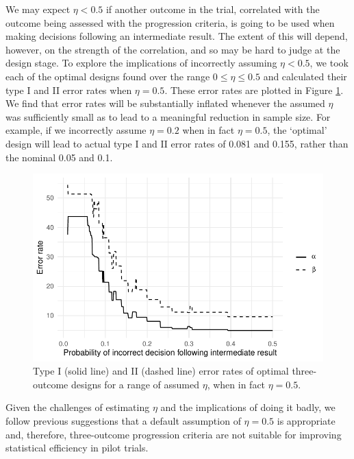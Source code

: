\documentclass[sagev]{sagej}
\begin{document}
We may expect $\eta < 0.5$ if another outcome in the trial, correlated with the outcome being assessed with the progression criteria, is going to be used when making decisions following an intermediate result. The extent of this will depend, however, on the strength of the correlation, and so may be hard to judge at the design stage. To explore the implications of incorrectly assuming $\eta < 0.5$, we took each of the optimal designs found over the range $0 \leq \eta \leq 0.5$ and calculated their type I and II error rates when $\eta = 0.5$. These error rates are plotted in Figure \ref{fig:eta_true_ocs}. We find that error rates will be substantially inflated whenever the assumed $\eta$ was sufficiently small as to lead to a meaningful reduction in sample size. For example, if we incorrectly assume $\eta = 0.2$ when in fact $\eta = 0.5$, the `optimal' design will lead to actual type I and II error rates of 0.081 and 0.155, rather than the nominal 0.05 and 0.1.

\begin{figure}
\centering
\includegraphics[scale=0.8]{./figures/eta_true_ocs}
\caption{Type I (solid line) and II (dashed line) error rates of optimal three-outcome designs for a range of assumed $\eta$, when in fact $\eta = 0.5$.}
\label{fig:eta_true_ocs}
\end{figure}


Given the challenges of estimating $\eta$ and the implications of doing it badly, we follow previous suggestions \cite{Sargent2001a, Dehbi2020} that a default assumption of $\eta = 0.5$ is appropriate and, therefore, three-outcome progression criteria are not suitable for improving statistical efficiency in pilot trials.
\end{document}
